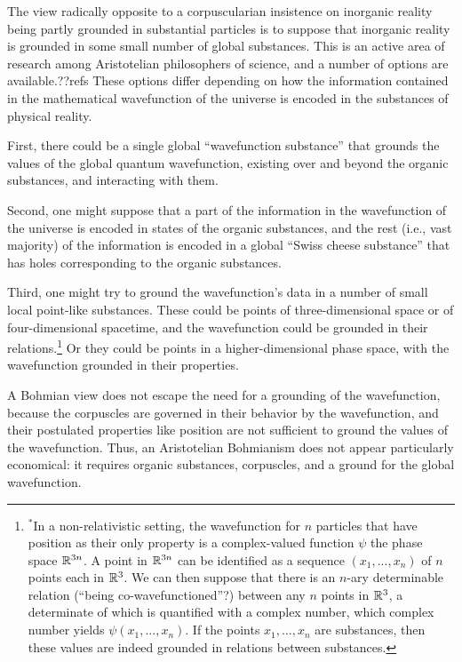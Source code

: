 The view radically opposite to a corpuscularian insistence on inorganic reality being partly grounded in substantial 
particles is to suppose that inorganic reality is grounded in some small number of global substances. This is an 
active area of research among Aristotelian philosophers of science, and a number of options are available.??refs 
These options differ depending on how the information contained in the mathematical wavefunction of the universe
is encoded in the substances of physical reality.

First, there 
could be a single global ``wavefunction substance'' that grounds the values of the global quantum wavefunction, existing
over and beyond the organic substances, and interacting with them.

Second, one might suppose that a part of the information in the 
wavefunction of the universe is encoded in states of the organic substances, and the rest (i.e., vast majority) of 
the information is encoded in a global ``Swiss cheese substance'' that has holes corresponding to the organic substances. 

Third, one might try to ground the wavefunction's data in a number of small local point-like substances.
These could be points of three-dimensional space or of four-dimensional spacetime, and the wavefunction could be 
grounded in their relations.\footnote{$^*$In a non-relativistic setting, the wavefunction for $n$ particles that 
have position as their only property is a complex-valued function $\psi$ the phase space $\mathbb R^{3n}$. A point in $\mathbb R^{3n}$ can 
be identified as a sequence $(x_1,...,x_n)$ of $n$ points each in $\mathbb R^3$. We can then suppose that there is an 
$n$-ary determinable relation (``being co-wavefunctioned''?) between any $n$ points in $\mathbb R^3$, a determinate of which is 
quantified with a complex number, which complex number yields $\psi(x_1,...,x_n)$. If the points $x_1,...,x_n$ are 
substances, then these values are indeed grounded in relations between substances.} Or they could be points in a higher-dimensional
phase space, with the wavefunction grounded in their properties. 

A Bohmian view does not escape the need for a grounding of the wavefunction, because the corpuscles are 
governed in their behavior by the wavefunction, and their postulated properties like position are not sufficient to ground the values of the wavefunction. Thus, an Aristotelian Bohmianism does not appear particularly economical: it requires organic
substances, corpuscles, and a ground for the global wavefunction.

